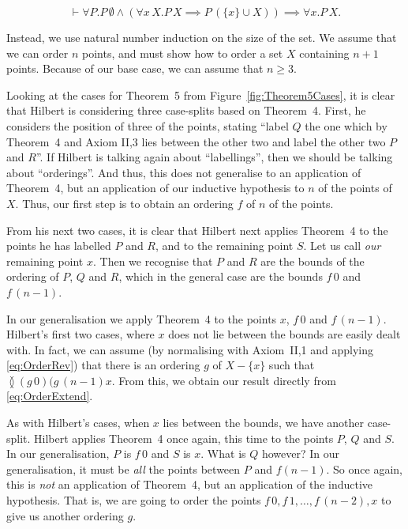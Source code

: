 \begin{displaymath}
\vdash \forall P. P\,\emptyset \wedge (\forall x\, X. P\,X \implies P\,(\{x\} \cup X)) \implies \forall x. P\,X.
\end{displaymath}

Instead, we use natural number induction on the size of the set. We assume that we can order $n$ points, and must show how to order a set $X$ containing $n+1$ points. Because of our base case, we can assume that $n \geq 3$.

Looking at the cases for Theorem~5 from Figure~\ref{fig:Theorem5Cases}, it is clear that Hilbert is considering three case-splits based on Theorem~4. First, he considers the position of three of the points, stating ``label $Q$ the one which by Theorem~4 and Axiom II,3 lies between the other two and label the other two $P$ and $R$''. If Hilbert is talking again about ``labellings'', then we should be talking about ``orderings''. And thus, this does not generalise to an application of Theorem~4, but an application of our inductive hypothesis to $n$ of the points of $X.$ Thus, our first step is to obtain an ordering $f$ of $n$ of the points.

From his next two cases, it is clear that Hilbert next applies Theorem~4 to the points he has labelled $P$ and $R$, and to the remaining point $S$. Let us call \emph{our} remaining point $x$. Then we recognise that $P$ and $R$ are the bounds of the ordering of $P$, $Q$ and $R$, which in the general case are the bounds $f\,0$ and $f\,(n - 1)$.

In our generalisation we apply Theorem~4 to the points $x$, $f\,0$ and $f\,(n - 1)$. Hilbert's first two cases, where $x$ does not lie between the bounds are easily dealt with. In fact, we can assume (by normalising with Axiom~II,1 and applying \eqref{eq:OrderRev}) that there is an ordering $g$ of $X - \{x\}$ such that $\between{(g\,0)}{(g\,(n - 1)}{x}$. From this, we obtain our result directly from \eqref{eq:OrderExtend}.

As with Hilbert's cases, when $x$ lies between the bounds, we have another case-split. Hilbert applies Theorem~4 once again, this time to the points $P$, $Q$ and $S$. In our generalisation, $P$ is $f\,0$ and $S$ is $x$. What is $Q$ however? In our generalisation, it must be \emph{all} the points between $P$ and $f(n - 1)$. So once again, this is \emph{not} an application of Theorem~4, but an application of the inductive hypothesis. That is, we are going to order the points $f\,0,f\,1,\ldots,f\,(n - 2),x$ to give us another ordering $g$.

